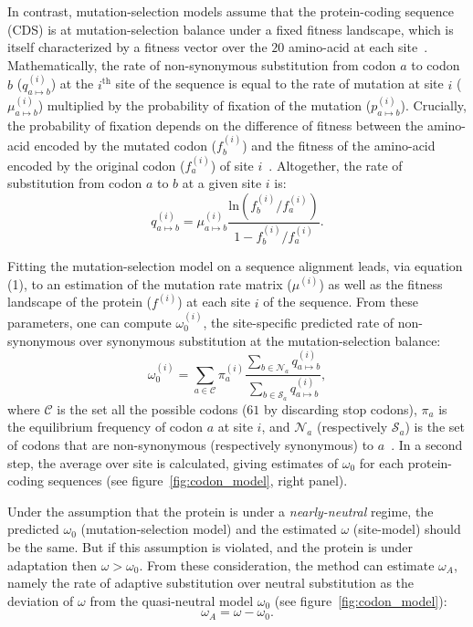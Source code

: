 \documentclass{article}
\begin{document}
In contrast, mutation-selection models assume that the protein-coding sequence (CDS) is at mutation-selection balance under a fixed fitness landscape, which is itself characterized by a fitness vector over the $20$ amino-acid at each site~\citep{Yang2008, Halpern1998, Rodrigue2010}.
Mathematically, the rate of non-synonymous substitution from codon $a$ to codon $b$ ($q_{a \mapsto b}^{(i)}$) at the $i^{\mathrm{th}}$ site of the sequence is equal to the rate of mutation at site $i$ ($\mu_{a \mapsto b}^{(i)}$) multiplied by the probability of fixation of the mutation ($p_{a \mapsto b}^{(i)}$).
Crucially, the probability of fixation depends on the difference of fitness between the amino-acid encoded by the mutated codon ($f_b^{(i)}$) and the fitness of the amino-acid encoded by the original codon ($f_a^{(i)}$) of site $i$~\citep{wright_evolution_1931, fisher_genetical_1930}.
Altogether, the rate of substitution from codon $a$ to $b$ at a given site $i$ is:
\begin{equation}
	q_{a \mapsto b}^{(i)} = \mu_{a \mapsto b}^{(i)} \dfrac{\mathrm{ln}(f_b^{(i)} / f_a^{(i)})}{1 - f_b^{(i)} / f_a^{(i)}}.
\end{equation}

Fitting the mutation-selection model on a sequence alignment leads, via equation (1), to an estimation of the mutation rate matrix ($\mu^{(i)}$) as well as the fitness landscape of the protein ($f^{(i)}$) at each site $i$ of the sequence.
From these parameters, one can compute $\omega_{0}^{(i)}$, the site-specific predicted rate of non-synonymous over synonymous substitution at the mutation-selection balance: 
\begin{equation}
\omega_{0}^{(i)} = \sum_{a \in  \mathcal{C}} \pi_a^{(i)}  \dfrac{\sum_{b \in  \mathcal{N}_a} q_{a \mapsto b}^{(i)}}{\sum_{b \in \mathcal{S}_a} q_{a \mapsto b}^{(i)}},
\end{equation}
where $\mathcal{C}$ is the set all the possible codons ($61$ by discarding stop codons), $\pi_a$ is the equilibrium frequency of codon $a$ at site $i$, and $\mathcal{N}_a$ (respectively $\mathcal{S}_a$) is the set of codons that are non-synonymous (respectively synonymous) to $a$~\citep{Spielman2015, Rodrigue2016}.
In a second step, the average over site is calculated, giving estimates of $\omega_0$ for each protein-coding sequences (see figure~\ref{fig:codon_model}, right panel).

Under the assumption that the protein is under a \textit{nearly-neutral} regime,  the predicted $\omega_0$ (mutation-selection model) and the estimated $\omega$ (site-model) should be the same.
But if this assumption is violated, and the protein is under adaptation then $\omega > \omega_0$.
From these consideration, the method can estimate $\omega_A$, namely the rate of adaptive substitution over neutral substitution as the deviation of $\omega$ from the quasi-neutral model $\omega_0$ (see figure~\ref{fig:codon_model}):
\begin{equation}
	\omega_A = \omega - \omega_0.
\end{equation}
\end{document}

